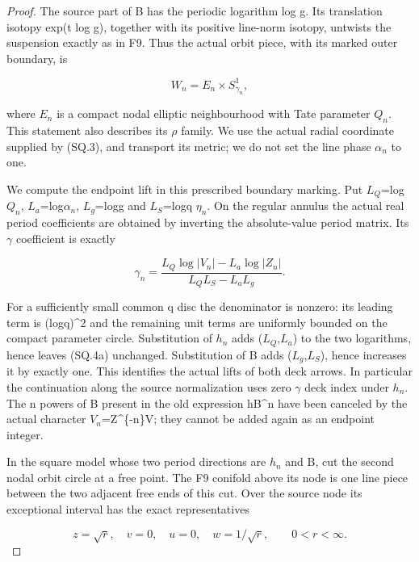 \begin{proof}
The source part of B has the periodic logarithm log g. Its translation
isotopy exp(t log g), together with its positive line-norm isotopy,
untwists the suspension exactly as in F9. Thus the actual orbit piece,
with its marked outer boundary, is

\[
                     W_n=E_n\times S^1_{\gamma_n},       \tag{SQ.4}
\]

where \(E_{n}\) is a compact nodal elliptic neighbourhood with Tate
parameter \(Q_{n}\). This statement also describes its \(\rho\) family. We use
the actual radial coordinate supplied by (SQ.3), and transport its
metric; we do not set the line phase \(\alpha_{n}\) to one.

We compute the endpoint lift in this prescribed boundary marking.
Put \(L_{Q}\)=log\textbar{}\(Q_{n}\)\textbar, \(L_{a}\)=log\textbar{}\(\alpha_{n}\)\textbar, \(L_{g}\)=log\textbar g\textbar{} and
\(L_{S}\)=log\textbar q \(\eta_{n}\)\textbar. On the regular annulus the actual real period
coefficients are obtained by inverting the absolute-value period matrix.
Its \(\gamma\) coefficient is exactly

\[
 \gamma_n=
 \frac{L_Q\log|V_n|-L_a\log|Z_n|}{L_QL_S-L_aL_g}.
                                                        \tag{SQ.4a}
\]

For a sufficiently small common q disc the denominator is nonzero:
its leading term is (log\textbar q\textbar)\^{}2 and the remaining unit terms are
uniformly bounded on the compact parameter circle. Substitution of
\(h_{n}\) adds (\(L_{Q}\),\(L_{a}\)) to the two logarithms, hence leaves (SQ.4a)
unchanged. Substitution of B adds (\(L_{g}\),\(L_{S}\)), hence increases it by
exactly one. This identifies the actual lifts of both deck arrows.
In particular the continuation along the source normalization uses
zero \(\gamma\) deck index under \(h_{n}\). The n powers of B present in the
old expression hB\^{}n have been canceled by the actual character
\(V_{n}\)=Z\^{}\{-n\}V; they cannot be added again as an endpoint integer.

In the square model whose two period directions are \(h_{n}\) and B,
cut the second nodal orbit circle at a free point. The F9 conifold
above its node is one line piece between the two adjacent free
ends of this cut. Over the source node its exceptional interval has
the exact representatives

\[
 z=\sqrt r,\quad v=0,\quad u=0,\quad w=1/\sqrt r,
                         \qquad0<r<\infty .             \tag{SQ.4b}
\]


\end{proof}
